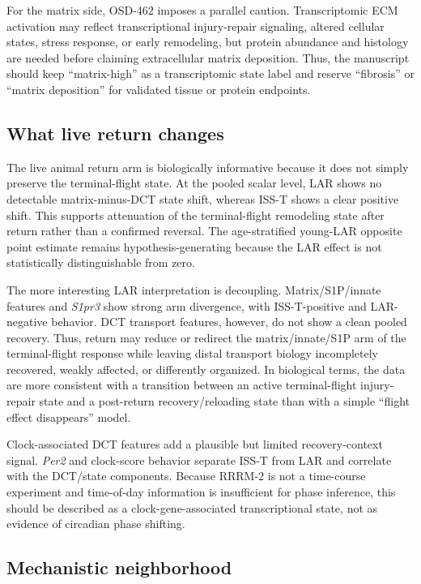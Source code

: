 \documentclass[11pt]{article}
\newcommand{\gene}[1]{\textit{#1}}
\begin{document}
For the matrix side, OSD-462 imposes a parallel caution. Transcriptomic ECM activation may reflect transcriptional injury-repair signaling, altered cellular states, stress response, or early remodeling, but protein abundance and histology are needed before claiming extracellular matrix deposition. Thus, the manuscript should keep ``matrix-high'' as a transcriptomic state label and reserve ``fibrosis'' or ``matrix deposition'' for validated tissue or protein endpoints.

\subsection{What live return changes}

The live animal return arm is biologically informative because it does not simply preserve the terminal-flight state. At the pooled scalar level, LAR shows no detectable matrix-minus-DCT state shift, whereas ISS-T shows a clear positive shift. This supports attenuation of the terminal-flight remodeling state after return rather than a confirmed reversal. The age-stratified young-LAR opposite point estimate remains hypothesis-generating because the LAR effect is not statistically distinguishable from zero.

The more interesting LAR interpretation is decoupling. Matrix/S1P/innate features and \gene{S1pr3} show strong arm divergence, with ISS-T-positive and LAR-negative behavior. DCT transport features, however, do not show a clean pooled recovery. Thus, return may reduce or redirect the matrix/innate/S1P arm of the terminal-flight response while leaving distal transport biology incompletely recovered, weakly affected, or differently organized. In biological terms, the data are more consistent with a transition between an active terminal-flight injury-repair state and a post-return recovery/reloading state than with a simple ``flight effect disappears'' model.

Clock-associated DCT features add a plausible but limited recovery-context signal. \gene{Per2} and clock-score behavior separate ISS-T from LAR and correlate with the DCT/state components. Because RRRM-2 is not a time-course experiment and time-of-day information is insufficient for phase inference, this should be described as a clock-gene-associated transcriptional state, not as evidence of circadian phase shifting.

\subsection{Mechanistic neighborhood}
\end{document}
